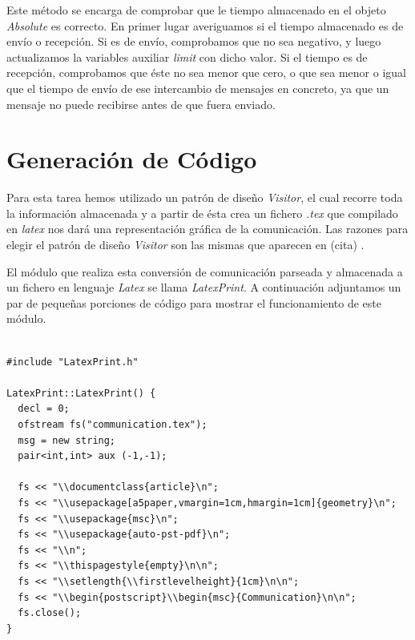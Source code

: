 Este método se encarga de comprobar que le tiempo almacenado en el
objeto \textit{Absolute} es correcto. En primer lugar averiguamos si
el tiempo almacenado es de envío o recepción. Si es de envío,
comprobamos que no sea negativo, y luego actualizamos la variables
auxiliar \textit{limit} con dicho valor. Si el tiempo es de recepción,
comprobamos que éste no sea menor que cero, o que sea menor o igual
que el tiempo de envío de ese intercambio de mensajes en concreto, ya
que un mensaje no puede recibirse antes de que fuera enviado.    

\section{Generación de Código}

Para esta tarea hemos utilizado un patrón de diseño \textit{Visitor},
el cual recorre toda la información almacenada y a partir de ésta crea
un fichero \textit{.tex} que compilado en \textit{latex} nos dará una
representación gráfica de la comunicación. Las razones para elegir el
patrón de diseño \textit{Visitor} son las mismas que aparecen en
(cita) .

El módulo que realiza esta conversión de comunicación parseada y
almacenada a un fichero en lenguaje \textit{Latex} se llama
\textit{LatexPrint}. A continuación adjuntamos un par de pequeñas porciones de
código para mostrar el funcionamiento de este módulo.

\begin{lstlisting}

#include "LatexPrint.h"

LatexPrint::LatexPrint() {
  decl = 0;
  ofstream fs("communication.tex");
  msg = new string;
  pair<int,int> aux (-1,-1); 
  
  fs << "\\documentclass{article}\n";
  fs << "\\usepackage[a5paper,vmargin=1cm,hmargin=1cm]{geometry}\n";
  fs << "\\usepackage{msc}\n";
  fs << "\\usepackage{auto-pst-pdf}\n";
  fs << "\\n";
  fs << "\\thispagestyle{empty}\n\n";
  fs << "\\setlength{\\firstlevelheight}{1cm}\n\n";
  fs << "\\begin{postscript}\\begin{msc}{Communication}\n\n";
  fs.close();
}

\end{lstlisting}

